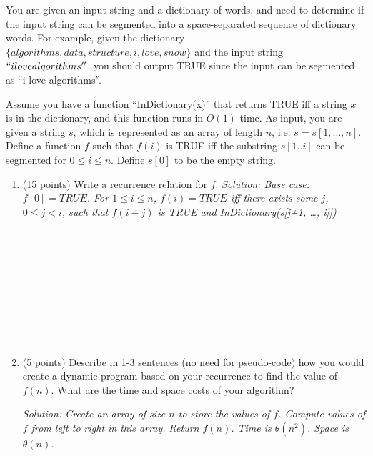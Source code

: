 \documentclass[11pt]{article}
\newcommand{\ans}[1]{\emph{Solution: #1}}
\begin{document}
\begin{enumerate}
You are given an input string and a dictionary of words, and need to determine if the input string can be segmented into a space-separated sequence of dictionary words.  For example, given the dictionary $\{algorithms, data, structure, i, love, snow\}$ and the input string $``ilovealgorithms''$, you should output TRUE since the input can be segmented as ``i love algorithms''.  

Assume you have a function ``InDictionary(x)'' that returns TRUE iff a string $x$ is in the dictionary, and this function runs in $O(1)$ time.  As input, you are given a string $s$, which is represented as an array of length $n$, i.e. $s = s[1,\ldots,n]$.   Define a function $f$ such that $f(i)$ is TRUE iff the substring $s[1..i]$ can be segmented for $0 \leq i  \leq n$.  Define $s[0]$ to be the empty string.

\begin{enumerate}

\item (15 points) Write a recurrence relation for $f$.
\ans{Base case: $f[0] = TRUE$.  For $1 \leq i \leq n$,  $f(i) = TRUE$ iff there exists some $j$, $0 \leq j < i$, such that $f(i-j)$ is TRUE and InDictionary(s[j+1, \ldots, i]])} \\ \ \\ \ \\ \ \\ \ \\ \\ \ \\ \ \\ \ \\ \ \\


\item (5 points) Describe in 1-3 sentences (no need for pseudo-code) how you would create a dynamic program based on your recurrence to find the value of $f(n)$.  What are the time and space costs of your algorithm?

\ans{Create an array of size $n$ to store the values of $f$.  Compute values of $f$ from left to right in this array.   Return $f(n)$.  Time is $\theta(n^{2})$.  Space is $\theta(n)$.}

\end{enumerate}





\end{enumerate}
\end{document}
